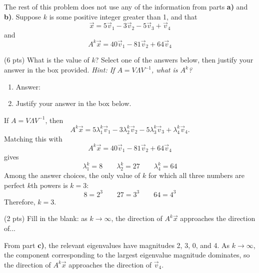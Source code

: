 \documentclass[11pt]{article}
\begin{document}
\begin{prob}[(12 pts)]
The rest of this problem does not use any of the information from parts \textbf{a)} and \textbf{b)}. Suppose $k$ is some positive integer greater than 1, and that
$$\vec x = 5 \vec v_1 - 3 \vec v_2 - 5 \vec v_3 + \vec v_4 $$
and
$$A^k \vec x = 40 \vec v_1 - 81 \vec v_2 + 64 \vec v_4$$
    
\begin{subprob}(6 pts) What is the value of $k$? Select one of the answers below, then justify your answer in the box provided. \textit{Hint: If $A = V \Lambda V^{-1}$, what is $A^k$?}

\begin{enumerate}
    \item Answer: \: \:    
    \item Justify your answer in the box below. \\  \emptybox{6cm}{}
\end{enumerate}
\begin{solution}
If $A = V\Lambda V^{-1}$, then
\[
A^k \vec x = 5\lambda_1^k \vec v_1 - 3\lambda_2^k \vec v_2 - 5\lambda_3^k \vec v_3 + \lambda_4^k \vec v_4.
\]
Matching this with
\[
A^k \vec x = 40 \vec v_1 - 81 \vec v_2 + 64 \vec v_4
\]
gives
\[
\lambda_1^k = 8 \qquad \lambda_2^k = 27 \qquad \lambda_4^k = 64
\]
Among the answer choices, the only value of $k$ for which all three numbers are perfect $k$th powers is $k=3$:
\[
8 = 2^3 \qquad 27 = 3^3 \qquad 64 = 4^3
\]
Therefore, $\boxed{k = 3}$.
\end{solution}
    
\end{subprob}

\begin{subprob}(2 pts) Fill in the blank: as $k \to \infty$, the direction of $A^k \vec x$ approaches the direction of... \\

   
\begin{solution}
From part \textbf{c)}, the relevant eigenvalues have magnitudes 2, 3, 0, and 4. As $k \to \infty$, the component corresponding to the largest eigenvalue magnitude dominates, so the direction of $A^k \vec x$ approaches the direction of $\boxed{\vec v_4}$.
\end{solution}
\end{subprob}

\end{prob}
\end{document}
